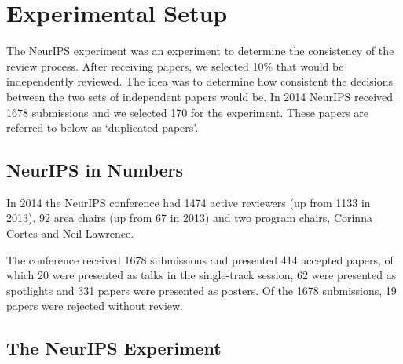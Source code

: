 


\hypertarget{introduction}{%
\section{Experimental Setup}\label{introduction}}

The NeurIPS experiment was an experiment to determine the consistency of
the review process. After receiving papers, we selected 10\% that would
be independently reviewed. The idea was to determine how consistent
the decisions between the two sets of independent papers would be. In
2014 NeurIPS received 1678 submissions and we selected 170 for the
experiment. These papers are referred to below as `duplicated papers'.


\hypertarget{neurips-in-numbers}{%
\subsection{NeurIPS in Numbers}\label{neurips-in-numbers}}

\begin{flushright}
\end{flushright}

In 2014 the NeurIPS conference had 1474 active reviewers (up from 1133
in 2013), 92 area chairs (up from 67 in 2013) and two program chairs,
Corinna Cortes and Neil Lawrence.

The conference received 1678 submissions and presented 414 accepted
papers, of which 20 were presented as talks in the single-track session,
62 were presented as spotlights and 331 papers were presented as
posters. Of the 1678 submissions, 19 papers were rejected without
review.
\ignore{}
\hypertarget{the-neurips-experiment}{%
\subsection{The NeurIPS Experiment}\label{the-neurips-experiment}}

